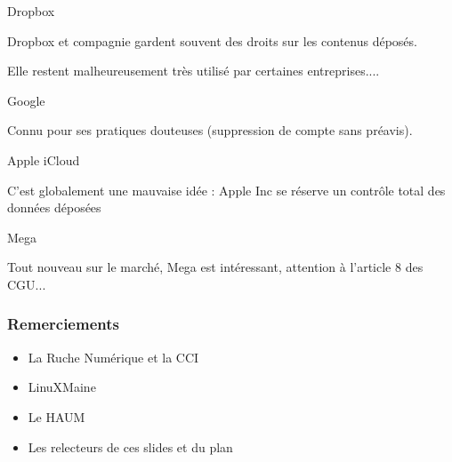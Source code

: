 \documentclass{beamer}
\begin{document}
\begin{frame}

    \begin{block}{Dropbox}

        Dropbox et compagnie gardent souvent des droits sur les contenus déposés.

        Elle restent malheureusement très utilisé par certaines entreprises....

    \end{block}

    \pause{}

    \begin{block}{Google}

        Connu pour ses pratiques douteuses (suppression de compte sans préavis).

    \end{block}

\end{frame}
\begin{frame}

    \begin{block}{Apple iCloud}

        C'est globalement une mauvaise idée : Apple Inc se réserve un contrôle total des données déposées

    \end{block}

    \pause{}

    \begin{block}{Mega}

        Tout nouveau sur le marché, Mega est intéressant, attention à l'article 8 des CGU...

    \end{block}
\end{frame}

\begin{frame}
    
    \frametitle{Remerciements}

    \begin{itemize}
        \item La Ruche Numérique et la CCI
        \item LinuXMaine
        \item Le HAUM
        \item Les relecteurs de ces slides et du plan
    \end{itemize}

    \pause{}


\end{frame}
\end{document}
